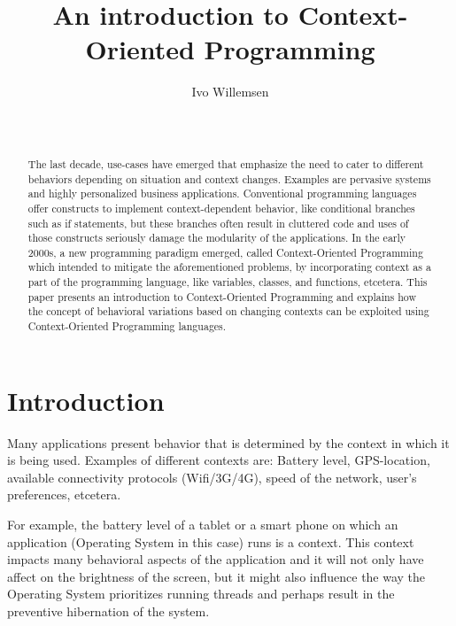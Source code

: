 \documentclass{acm_proc_article-sp}
\begin{document}
\title{An introduction to Context-Oriented Programming}

\author{
\alignauthor
Ivo Willemsen\\
       \\
       \\
}

\maketitle
\begin{abstract}
The last decade, use-cases have emerged that emphasize the need to cater to different behaviors depending on situation and context changes. Examples are pervasive systems and highly personalized business applications. Conventional programming languages offer constructs to implement context-dependent behavior, like  conditional branches such as if statements, but these branches often result in cluttered code and uses of those 
constructs seriously damage the modularity of the applications. In the early 2000s, a new programming paradigm emerged, called Context-Oriented Programming which intended to mitigate the aforementioned problems, by incorporating context as a part of the programming language, like variables, classes, and functions, etcetera. This paper presents an introduction to Context-Oriented Programming and explains how the concept of behavioral variations based on changing contexts can be exploited using Context-Oriented Programming languages.
\end{abstract}


\section{Introduction} \label{introduction}
Many applications present behavior that is determined by the context in which it is being used. Examples of different contexts are: Battery level, GPS-location, available connectivity protocols (Wifi/3G/4G), speed of the network, user's preferences, etcetera.

For example, the battery level of a tablet or a smart phone on which an application (Operating System in this case) runs is a context. This context impacts many behavioral aspects of the application and it will not only have affect on the brightness of the screen, but it might also influence the way the Operating System prioritizes running threads and perhaps result in the preventive hibernation of the system.
\end{document}
